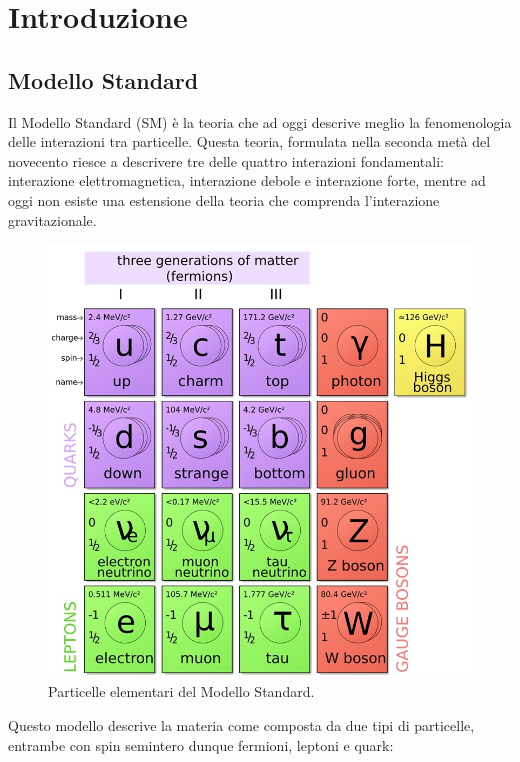 \chapter{Introduzione}

\section{Modello Standard}
Il Modello Standard (SM) è la teoria che ad oggi descrive meglio la fenomenologia delle interazioni tra particelle. Questa teoria, formulata nella seconda metà del novecento riesce a descrivere tre delle quattro interazioni fondamentali: interazione elettromagnetica, interazione debole e interazione forte, mentre ad oggi non esiste una estensione della teoria che comprenda l'interazione gravitazionale.


\begin{figure}
\centering
\includegraphics[scale=0.3]{Immagini/SM}
\caption{Particelle elementari del Modello Standard.}
\label{fig:SM}
\end{figure}

Questo modello descrive la materia come composta da due tipi di particelle, entrambe con spin semintero dunque fermioni, leptoni e quark:

